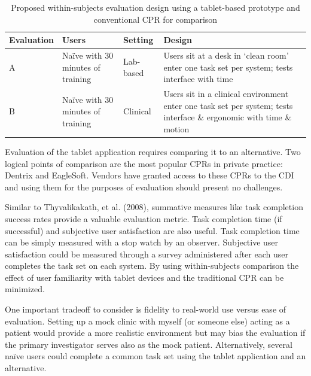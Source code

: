 \documentclass[11pt]{article}
\newcommand{\ra}[1]{\renewcommand{\arraystretch}{#1}}
\begin{document}
\begin{table}[h!b]
\label{evaldesign}
\caption{Proposed within-subjects evaluation design using a tablet-based prototype and conventional CPR for comparison}
	\begin{center}
	\ra{1.3}
\begin{tabular*}{\textwidth}{p{1.9cm}p{2cm}p{2cm}p{5cm}}  
\toprule
\textbf{Evaluation} & \textbf{Users} & \textbf{Setting} & \textbf{Design} \\
\midrule
A & Na\"{i}ve with 30 minutes of training & Lab-based & Users sit at a desk in `clean room' enter one task set per system; tests interface with time \vspace{4pt}\\ 

B & Na\"{i}ve with 30 minutes of training & Clinical & Users sit in a clinical environment enter one task set per system; tests interface \& ergonomic with time \& motion \\
\bottomrule
\end{tabular*} \end{center}\end{table}

Evaluation of the tablet application requires comparing it to an alternative. Two logical points of comparison are the most popular CPRs in private practice: Dentrix and EagleSoft. Vendors have granted access to these CPRs to the CDI and using them for the purposes of evaluation should present no challenges.

Similar to Thyvalikakath, et al. (2008), summative measures like task completion success rates provide a valuable evaluation metric. Task completion time (if successful) and subjective user satisfaction are also useful\cite{Chin1998Development-of-}. Task completion time can be simply measured with a stop watch by an observer. Subjective user satisfaction could be measured through a survey administered after each user completes the task set on each system. By using within-subjects comparison the effect of user familiarity with tablet devices and the traditional CPR can be minimized.

One important tradeoff to consider is fidelity to real-world use versus ease of evaluation. Setting up a mock clinic with myself (or someone else) acting as a patient would provide a more realistic environment but may bias the evaluation if the primary investigator serves also as the mock patient. Alternatively, several na\"{i}ve users could complete a common task set using the tablet application and an alternative.
\end{document}
